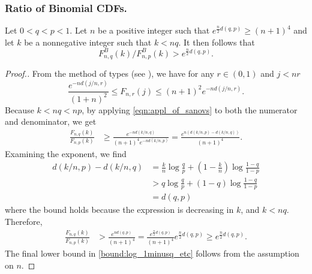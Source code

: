\subsubsection{Ratio of Binomial CDFs.} \label{sec:ratio_of_bin_cdfs}
\begin{lemma} \label{lemma:ratio_of_cdfs}
	Let $0< q < p < 1$. Let $n$ be a positive integer such that $e^{\frac{n}{2} d(q,p)} \ge (n+1)^4$ and let $k$ be a nonnegative integer such that $k < nq$. It then follows that
	\[
	F^B_{n,q}(k)/F^B_{n,p}(k) >  e^{\frac{n}{2} d(q,p)}.
	\]
\end{lemma}
\begin{proof}[Proof.]
	From the method of types  (see \cite{cover2012elements}), we have for any $r \in (0,1)$ and $j < nr$
	\begin{equation} \label{eqn:appl_of_sanovs}
	\frac{e^{-nd(j/n, r)}}{(1+n)^2}\le F_{n,r}(j) \le (n+1)^2 e^{- n d(j/n, r)}.
	\end{equation}
	Because $k < nq < np$, by applying \eqref{eqn:appl_of_sanovs} to both the numerator and denominator, we get
	\begin{align*}
	\frac{F_{n,q}(k)}{F_{n,p}(k)} & \ge  \frac{e^{-nd(k/n, q)}}{(n+1)^4 e^{- n d(k/n, p)}} = \frac{e^{n(d(k/n,p) - d(k/n,q))}}{(n+1)^4}.
	\end{align*}
	Examining the exponent, we find
	\begin{align*}
	d(k/n, p) - d(k/n,q) & = \frac{k}{n} \log \frac{q}{p} + \left(1-\frac{k}{n}\right)\log \frac{1-q}{1-p} \\
	& > q \log \frac{q}{p} + (1-q)\log \frac{1-q}{1-p} \\
	& = d(q,p)
	\end{align*}
	where the bound holds because the expression is decreasing in $k$, and $k < nq$. Therefore,
	\begin{align}
	\frac{F_{n,q}(k)}{F_{n,p}(k)} & > \frac{e^{n  d(q,p)}}{(n+1)^4} = \frac{e^{\frac{n}{2}d(q,p)}}{(n+1)^4} e^{\frac{n}{2}d(q,p)} \ge e^{\frac{n}{2}d(q,p)} \label{bound:log_1minusq_etc}.
	\end{align}
	The final lower bound in \eqref{bound:log_1minusq_etc} follows from the assumption on $n$.
\end{proof}

